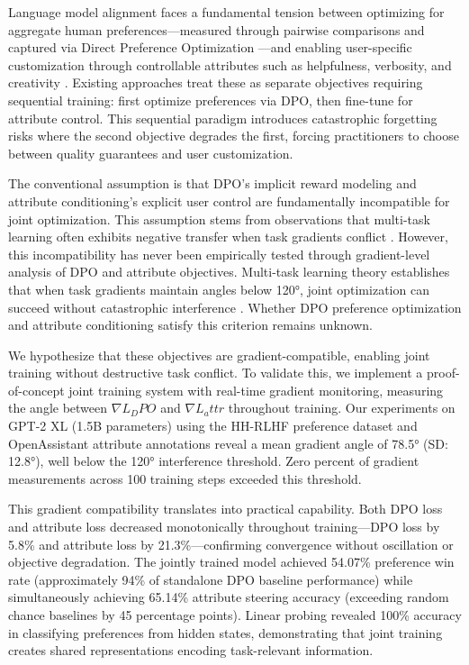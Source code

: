 
Language model alignment faces a fundamental tension between optimizing for aggregate human preferences---measured through pairwise comparisons and captured via Direct Preference Optimization \citep{Rafailov2023DPO}---and enabling user-specific customization through controllable attributes such as helpfulness, verbosity, and creativity \citep{Dong2023SteerLM}. Existing approaches treat these as separate objectives requiring sequential training: first optimize preferences via DPO, then fine-tune for attribute control. This sequential paradigm introduces catastrophic forgetting risks where the second objective degrades the first, forcing practitioners to choose between quality guarantees and user customization.

The conventional assumption is that DPO's implicit reward modeling and attribute conditioning's explicit user control are fundamentally incompatible for joint optimization. This assumption stems from observations that multi-task learning often exhibits negative transfer when task gradients conflict \citep{Yu2020PCGrad}. However, this incompatibility has never been empirically tested through gradient-level analysis of DPO and attribute objectives. Multi-task learning theory establishes that when task gradients maintain angles below 120°, joint optimization can succeed without catastrophic interference \citep{Navon2022NashMTL}. Whether DPO preference optimization and attribute conditioning satisfy this criterion remains unknown.

We hypothesize that these objectives are gradient-compatible, enabling joint training without destructive task conflict. To validate this, we implement a proof-of-concept joint training system with real-time gradient monitoring, measuring the angle between $\nabla L_DPO$ and $\nabla L_attr$ throughout training. Our experiments on GPT-2 XL (1.5B parameters) using the HH-RLHF preference dataset and OpenAssistant attribute annotations reveal a mean gradient angle of 78.5° (SD: 12.8°), well below the 120° interference threshold. Zero percent of gradient measurements across 100 training steps exceeded this threshold.

This gradient compatibility translates into practical capability. Both DPO loss and attribute loss decreased monotonically throughout training---DPO loss by 5.8\% and attribute loss by 21.3\%---confirming convergence without oscillation or objective degradation. The jointly trained model achieved 54.07\% preference win rate (approximately 94\% of standalone DPO baseline performance) while simultaneously achieving 65.14\% attribute steering accuracy (exceeding random chance baselines by 45 percentage points). Linear probing revealed 100\% accuracy in classifying preferences from hidden states, demonstrating that joint training creates shared representations encoding task-relevant information.

